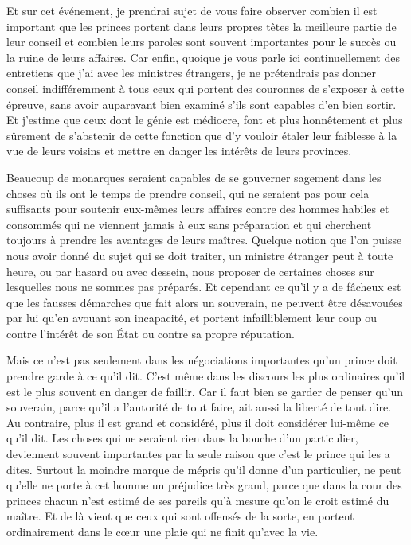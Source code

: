\documentclass[french,twoside]{book} %
\begin{document}
Et sur cet événement, je prendrai sujet de vous faire observer combien il est important que les princes portent dans leurs propres têtes la meilleure partie de leur conseil et combien leurs paroles sont souvent importantes pour le succès ou la ruine de leurs affaires. Car enfin, quoique je vous parle ici continuellement des entretiens que j’ai avec les ministres étrangers, je ne prétendrais pas donner conseil indifféremment à tous ceux qui portent des couronnes de s’exposer à cette épreuve, sans avoir auparavant bien examiné s’ils sont capables d’en bien sortir. Et j’estime que ceux dont le génie est médiocre, font et plus honnêtement et plus sûrement de s’abstenir de cette fonction que d’y vouloir étaler leur faiblesse à la vue de leurs voisins et mettre en danger les intérêts de leurs provinces.\par
Beaucoup de monarques seraient capables de se gouverner sagement dans les choses où ils ont le temps de prendre conseil, qui ne seraient pas pour cela suffisants pour soutenir eux-mêmes leurs affaires contre des hommes habiles et consommés qui ne viennent jamais à eux sans préparation et qui cherchent toujours à prendre les avantages de leurs maîtres. Quelque notion que l’on puisse nous avoir donné du sujet qui se doit traiter, un ministre étranger peut à toute heure, ou par hasard ou avec dessein, nous proposer de certaines choses sur lesquelles nous ne sommes pas préparés. Et cependant ce qu’il y a de fâcheux est que les fausses démarches que fait alors un souverain, ne peuvent être désavouées par lui qu’en avouant son incapacité, et portent infailliblement leur coup ou contre l’intérêt de son État ou contre sa propre réputation.\par
Mais ce n’est pas seulement dans les négociations importantes qu’un prince doit prendre garde à ce qu’il dit. C’est même dans les discours les plus ordinaires qu’il est le plus souvent en danger de faillir. Car il faut bien se garder de penser qu’un souverain, parce qu’il a l’autorité de tout faire, ait aussi la liberté de tout dire. Au contraire, plus il est grand et considéré, plus il doit considérer lui-même ce qu’il dit. Les choses qui ne seraient rien dans la bouche d’un particulier, deviennent souvent importantes par la seule raison que c’est le prince qui les a dites. Surtout la moindre marque de mépris qu’il donne d’un particulier, ne peut qu’elle ne porte à cet homme un préjudice très grand, parce que dans la cour des princes chacun n’est estimé de ses pareils qu’à mesure qu’on le croit estimé du maître. Et de là vient que ceux qui sont offensés de la sorte, en portent ordinairement dans le cœur une plaie qui ne finit qu’avec la vie.\par
\end{document}

